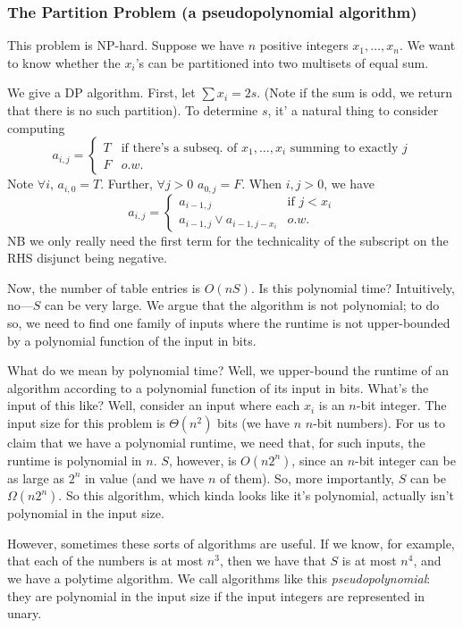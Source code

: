 \documentclass{article}
\newcommand{\beq}{\begin{equation}}
\newcommand{\eeq}{\end{equation}}
\begin{document}
\subsubsection{The Partition Problem (a pseudopolynomial algorithm)}

This problem is NP-hard.
Suppose we have $n$ positive integers $x_1, \ldots, x_n$.
We want to know whether the $x_i$'s can be partitioned into two multisets
of equal sum.

We give a DP algorithm.
First, let $\sum x_i = 2s$.
(Note if the sum is odd, we return that there is no such partition).
To determine $s$, it' a natural thing to consider computing
\beq
a_{i,j} = \left\{
\begin{array}{ll}
	T & \textrm{if there's a subseq. of $x_1,\ldots,x_i$ summing to exactly $j$} \\
	F & o.w.
\end{array}
\right.
\eeq
Note $\forall i$, $a_{i,0} = T$.
Further, $\forall j > 0$ $a_{0,j} = F$.
When $i,j > 0$, we have
\beq
a_{i,j} = \left\{
\begin{array}{ll}
	a_{i-1,j} & 
	\textrm{if } j < x_i
	\\
	a_{i-1,j} \vee a_{i-1,j-x_i}
	& o.w.
\end{array}
\right.
\eeq
NB we only really need the first term for the technicality of the subscript
on the RHS disjunct being negative.

Now, the number of table entries is $O(nS)$.
Is this polynomial time?
Intuitively, no---$S$ can be very large.
We argue that the algorithm is not polynomial; to do so, we need to find
one family of inputs where the runtime is not upper-bounded by a polynomial
function of the input in bits.

What do we mean by polynomial time?
Well, we upper-bound the runtime of an algorithm according to a polynomial
function of its input in bits.
What's the input of this like?
Well, consider an input where each $x_i$ is an $n$-bit integer.
The input size for this problem is $\Theta(n^2)$ bits (we have $n$ $n$-bit numbers).
For us to claim that we have a polynomial runtime, we need that, for such
inputs, the runtime is polynomial in $n$.
$S$, however, is $O(n 2^n)$, since an $n$-bit integer can be as large
as $2^n$ in value (and we have $n$ of them).
So, more importantly, $S$ can be $\Omega(n 2^n)$.
So this algorithm, which kinda looks like it's polynomial, actually
isn't polynomial in the input size.

However, sometimes these sorts of algorithms are useful.
If we know, for example, that each of the numbers is at most $n^3$, then we have
that $S$ is at most $n^4$, and we have a polytime algorithm.
We call algorithms like this \emph{pseudopolynomial}: they are
polynomial in the input size if the input integers are represented
in unary.
\end{document}
